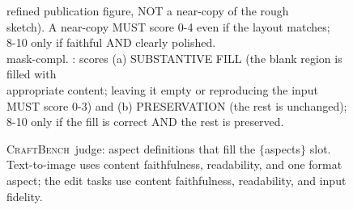 \documentclass{article}
\newcommand{\CrafterBench}{\textsc{CraftBench}\xspace}
\begin{document}
\begin{figure}[t]
\begin{tcolorbox}
\hspace*{8.0em}refined publication figure, NOT a near-copy of the rough \\
\hspace*{8.0em}sketch). A near-copy MUST score 0-4 even if the layout matches; \\
\hspace*{8.0em}8-10 only if faithful AND clearly polished. \\
\hspace*{1.0em}mask-compl. : scores (a) SUBSTANTIVE FILL (the blank region is filled with \\
\hspace*{8.0em}appropriate content; leaving it empty or reproducing the input \\
\hspace*{8.0em}MUST score 0-3) and (b) PRESERVATION (the rest is unchanged); \\
\hspace*{8.0em}8-10 only if the fill is correct AND the rest is preserved.
\end{tcolorbox}
\caption{\CrafterBench\ judge: aspect definitions that fill the $\{$aspects$\}$ slot. Text-to-image uses content faithfulness, readability, and one format aspect; the edit tasks use content faithfulness, readability, and input fidelity.}
\label{fig:prompt-judge-aspects}
\end{figure}
\end{document}

